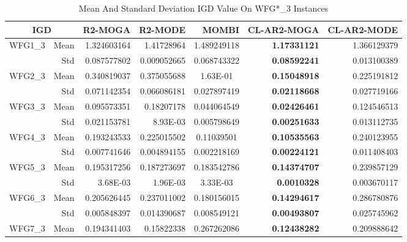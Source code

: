 \begin{table*}[htbp]
  \centering
  \caption{Mean And Standard Deviation IGD Value On WFG*\_3 Instances}
    \begin{tabular}{rrrrrrr}
    \toprule
    \multicolumn{2}{c}{IGD} & R2-MOGA & R2-MODE & MOMBI & CL-AR2-MOGA & CL-AR2-MODE \\
    \midrule
    \multirow{2}[0]{*}{WFG1\_3} & Mean  & 1.324603164 & 1.41728964 & \multicolumn{1}{c}{1.489249118} & \textbf{1.17331121} & 1.366129379 \\
          & Std   & 0.087577802 & 0.009052665 & \multicolumn{1}{c}{0.068743322} & \textbf{0.08592241} & 0.013100389 \\
    \multirow{2}[0]{*}{WFG2\_3} & Mean  & 0.340819037 & 0.375055688 & \multicolumn{1}{c}{1.63E-01} & \textbf{0.15048918} & 0.225191812 \\
          & Std   & 0.071142354 & 0.066086181 & \multicolumn{1}{c}{0.027897419} & \textbf{0.02118668} & 0.027719166 \\
    \multirow{2}[0]{*}{WFG3\_3} & Mean  & 0.095573351 & 0.18207178 & \multicolumn{1}{c}{0.044064549} & \textbf{0.02426461} & 0.124546513 \\
          & Std   & 0.021153781 & 8.93E-03 & \multicolumn{1}{c}{0.005798649} & \textbf{0.00251633} & 0.013112735 \\
    \multirow{2}[0]{*}{WFG4\_3} & Mean  & 0.193243533 & 0.225015502 & \multicolumn{1}{c}{0.11039501} & \textbf{0.10535563} & 0.240123955 \\
          & Std   & 0.007741646 & 0.004894155 & \multicolumn{1}{c}{0.002218169} & \textbf{0.00224121} & 0.011408403 \\
    \multirow{2}[0]{*}{WFG5\_3} & Mean  & 0.195317256 & 0.187273697 & \multicolumn{1}{c}{0.183542786} & \textbf{0.14374707} & 0.239857129 \\
          & Std   & 3.68E-03 & 1.96E-03 & \multicolumn{1}{c}{3.33E-03} & \textbf{0.0010328} & 0.003670117 \\
    \multirow{2}[0]{*}{WFG6\_3} & Mean  & 0.205626445 & 0.237011002 & \multicolumn{1}{c}{0.180156015} & \textbf{0.14294617} & 0.286780876 \\
          & Std   & 0.005848397 & 0.014390687 & \multicolumn{1}{c}{0.008549121} & \textbf{0.00493807} & 0.025745962 \\
    \multirow{2}[0]{*}{WFG7\_3} & Mean  & 0.194341403 & 0.15822338 & \multicolumn{1}{c}{0.267262086} & \textbf{0.12438282} & 0.209888642 \\

\end{tabular}
\end{table*}
